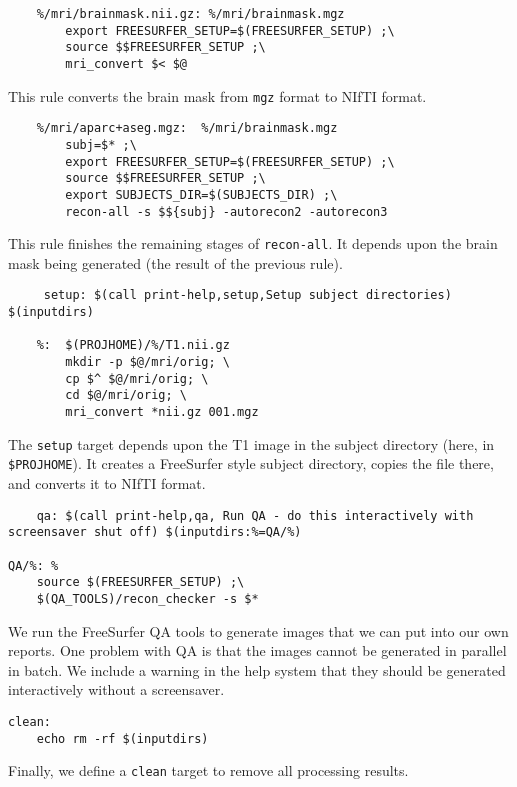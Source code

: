 \begin{lstlisting}
	%/mri/brainmask.nii.gz: %/mri/brainmask.mgz
		export FREESURFER_SETUP=$(FREESURFER_SETUP) ;\
		source $$FREESURFER_SETUP ;\
		mri_convert $< $@
\end{lstlisting}
This rule converts the brain mask from \texttt{mgz} format to NIfTI format.

\begin{lstlisting}
	%/mri/aparc+aseg.mgz:  %/mri/brainmask.mgz 
		subj=$* ;\
		export FREESURFER_SETUP=$(FREESURFER_SETUP) ;\
		source $$FREESURFER_SETUP ;\
		export SUBJECTS_DIR=$(SUBJECTS_DIR) ;\
		recon-all -s $${subj} -autorecon2 -autorecon3 
\end{lstlisting}

This rule finishes the remaining stages of
\texttt{recon-all}. It depends upon the brain mask being generated
(the result of the previous rule).

\begin{lstlisting}
	 setup: $(call print-help,setup,Setup subject directories) $(inputdirs) 

	%:  $(PROJHOME)/%/T1.nii.gz 
		mkdir -p $@/mri/orig; \
		cp $^ $@/mri/orig; \
		cd $@/mri/orig; \
		mri_convert *nii.gz 001.mgz 
\end{lstlisting}

The \texttt{setup} target depends upon the T1 image in the subject
directory (here, in \texttt{\$PROJHOME}). It creates a FreeSurfer
style subject directory, copies the file there, and converts it to
NIfTI format. 

\begin{lstlisting}
	qa: $(call print-help,qa, Run QA - do this interactively with screensaver shut off) $(inputdirs:%=QA/%)

QA/%: %
	source $(FREESURFER_SETUP) ;\
	$(QA_TOOLS)/recon_checker -s $*
\end{lstlisting}

We run the FreeSurfer QA tools to generate images that we can put into
our own reports. One problem with QA is that the images cannot be
generated in parallel in batch. We include a warning in the help
system that they should be generated interactively without a
screensaver. 

\begin{lstlisting}
clean:
	echo rm -rf $(inputdirs)
\end{lstlisting}

Finally, we define a \texttt{clean} target to remove all processing
results. 
